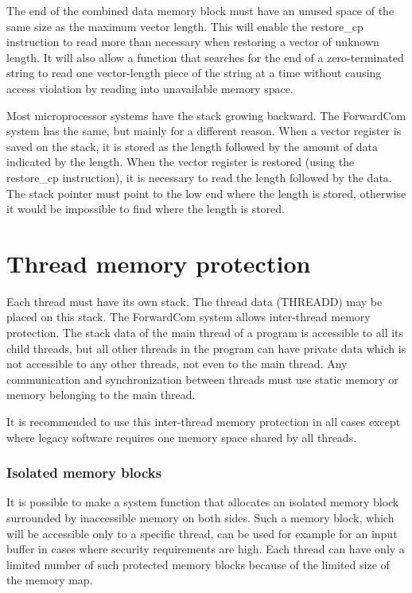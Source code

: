\documentclass[forwardcom.tex]{subfiles}
\begin{document}
The end of the combined data memory block must have an unused space of the same size as the maximum vector length. This will enable the restore\_cp instruction to read more than necessary when restoring a vector of unknown length. It will also allow a function that searches for the end of a zero-terminated string to read one vector-length piece of the string at a time without causing access violation by reading into unavailable memory space. 
\vspace{2mm}

Most microprocessor systems have the stack growing backward. The ForwardCom system has the same, but mainly for a different reason. When a vector register is saved on the stack, it is stored as the length followed by the amount of data indicated by the length. When the vector register is restored (using the restore\_cp instruction), it is necessary to read the length followed by the data. The stack pointer must point to the low end where the length is stored, otherwise it would be impossible to find where the length is stored. 

\section{Thread memory protection} \label{threadMemoryProtection}
Each thread must have its own stack. The thread data (THREADD) may be placed on this stack. The ForwardCom system allows inter-thread memory protection. The stack data of the main thread of a program is accessible to all its child threads, but all other threads in the program can have private data which is not accessible to any other threads, not even to the main thread. Any communication and synchronization between threads must use static memory or memory belonging to the main thread. 
\vspace{2mm}

It is recommended to use this inter-thread memory protection in all cases except where legacy software requires one memory space shared by all threads. 
\vspace{2mm}

\subsubsection{Isolated memory blocks} \label{isolatedMemoryBlocks}
It is possible to make a system function that allocates an isolated memory block surrounded by inaccessible memory on both sides. Such a memory block, which will be accessible only to a specific thread, can be used for example for an input buffer in cases where security requirements are high. Each thread can have only a limited number of such protected memory blocks because of the limited size of the memory map.
\end{document}
